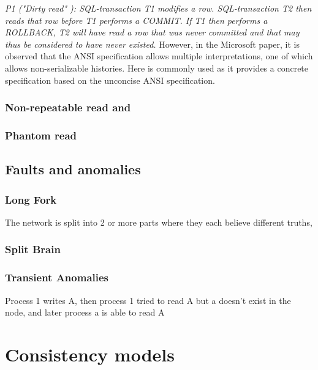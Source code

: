 \documentclass[a4paper,10pt,titlepage]{report}
\begin{document}
    \textit{P1 ("Dirty read" ): SQL-transaction T1 modifies a row. SQL-transaction T2 then reads that row before T1 performs a COMMIT. If T1 then performs a ROLLBACK, T2 will have read a row that was never committed and that may thus be considered to have never existed.} However, in the Microsoft paper, \cite{Berensonetal} it is observed that the ANSI specification allows multiple interpretations, one of which allows non-serializable histories. Here \cite{Adya99weakconsistency:} is commonly used as it provides a concrete specification based on the unconcise ANSI specification.

    \subsubsection{Non-repeatable read and}

    \subsubsection{Phantom read}

    \subsection{Faults and anomalies}

    \subsubsection{Long Fork}
    The network is split into 2 or more parts where they each believe different truths,

    \subsubsection{Split Brain}

    \subsubsection{Transient Anomalies}
    Process 1 writes A, then process 1 tried to read A but a doesn't exist in the node, and later process a is able to read A

    \newpage


    \section{Consistency models}
\end{document}
